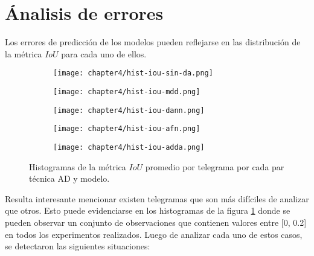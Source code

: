 \lipsum[1]

\section{\'Analisis de errores}

Los errores de predicci\'on de los modelos pueden reflejarse en las distribuci\'on de la m\'etrica $IoU$ para cada uno
de ellos.

\begin{figure}[H]
    \centering
    \begin{subfigure}[h]{0.43\textwidth}
        \texttt{[image: chapter4/hist-iou-sin-da.png]}
    \end{subfigure}
    \hfill
    \begin{subfigure}[h]{0.43\textwidth}
        \texttt{[image: chapter4/hist-iou-mdd.png]}
    \end{subfigure}
    \hfill
    \begin{subfigure}[h]{0.43\textwidth}
        \texttt{[image: chapter4/hist-iou-dann.png]}
    \end{subfigure}
    \hfill
    \begin{subfigure}[h]{0.43\textwidth}
        \texttt{[image: chapter4/hist-iou-afn.png]}
    \end{subfigure}
    \hfill
    \begin{subfigure}[h]{0.43\textwidth}
        \texttt{[image: chapter4/hist-iou-adda.png]}
    \end{subfigure}

    \caption{Histogramas de la m\'etrica $IoU$ promedio por telegrama por cada par t\'ecnica AD y modelo.}
    \label{fig:histogramas-ious}
\end{figure}

Resulta interesante mencionar existen telegramas que son m\'as dif\'iciles de analizar que otros. Esto puede
evidenciarse en los histogramas de la figura \ref{fig:histogramas-ious} donde se pueden observar un conjunto de
observaciones que contienen valores entre [0, 0.2] en todos los experimentos realizados. Luego de analizar cada uno de
estos casos, se detectaron las siguientes situaciones:

